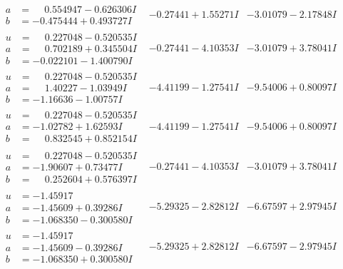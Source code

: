 \documentclass[1p]{elsarticle_modified}
\theoremstyle{definition}
\begin{document}
$$\begin{array}{c|c|c}
\begin{aligned}
a &= \phantom{-}0.554947 - 0.626306 I \\
b &= -0.475444 + 0.493727 I\end{aligned}
 & -0.27441 + 1.55271 I & -3.01079 - 2.17848 I \\ \hline\begin{aligned}
u &= \phantom{-}0.227048 - 0.520535 I \\
a &= \phantom{-}0.702189 + 0.345504 I \\
b &= -0.022101 - 1.400790 I\end{aligned}
 & -0.27441 - 4.10353 I & -3.01079 + 3.78041 I \\ \hline\begin{aligned}
u &= \phantom{-}0.227048 - 0.520535 I \\
a &= \phantom{-}1.40227 - 1.03949 I \\
b &= -1.16636 - 1.00757 I\end{aligned}
 & -4.41199 - 1.27541 I & -9.54006 + 0.80097 I \\ \hline\begin{aligned}
u &= \phantom{-}0.227048 - 0.520535 I \\
a &= -1.02782 + 1.62593 I \\
b &= \phantom{-}0.832545 + 0.852154 I\end{aligned}
 & -4.41199 - 1.27541 I & -9.54006 + 0.80097 I \\ \hline\begin{aligned}
u &= \phantom{-}0.227048 - 0.520535 I \\
a &= -1.90607 + 0.73477 I \\
b &= \phantom{-}0.252604 + 0.576397 I\end{aligned}
 & -0.27441 - 4.10353 I & -3.01079 + 3.78041 I \\ \hline\begin{aligned}
u &= -1.45917\phantom{ +0.000000I} \\
a &= -1.45609 + 0.39286 I \\
b &= -1.068350 - 0.300580 I\end{aligned}
 & -5.29325 - 2.82812 I & -6.67597 + 2.97945 I \\ \hline\begin{aligned}
u &= -1.45917\phantom{ +0.000000I} \\
a &= -1.45609 - 0.39286 I \\
b &= -1.068350 + 0.300580 I\end{aligned}
 & -5.29325 + 2.82812 I & -6.67597 - 2.97945 I \\ \hline\begin{aligned}

\end{aligned}
\end{array}$$
\end{document}
